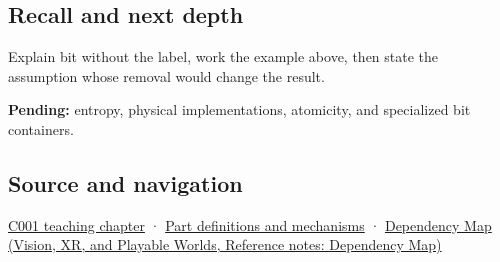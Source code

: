 \subsection{Recall and next depth}\label{appendix-ddbb69998a2e-recall-and-next-depth}

Explain bit without the label, work the example above, then state the assumption whose removal would change the result.

\textbf{Pending:} entropy, physical implementations, atomicity, and specialized bit containers.

\subsection{Source and navigation}\label{appendix-ddbb69998a2e-source-and-navigation}

\hyperref[01-foundations-i-ch001-from-a-signal-to-an-interpretation]{C001 teaching chapter} · \hyperref[appendix-fd090d982a15]{Part definitions and mechanisms} · \href{../07-Vision-XR-and-Playable-Worlds/main.pdf\#nameddest=appendix-4ad47bdd269a}{Dependency Map (Vision, XR, and Playable Worlds, Reference notes: Dependency Map)}
